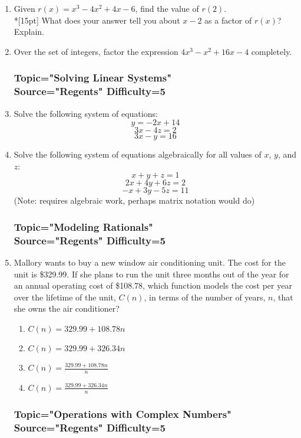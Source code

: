 \documentclass[12pt, oneside]{article}
\begin{document}
\begin{enumerate}
\item Given $r(x)=x^3-4x^2+4x-6$, find the value of $r(2)$.\\*[15pt]
What does your answer tell you about $x-2$ as a factor of $r(x)$? Explain. %

\item Over the set of integers, factor the expression $4x^3-x^2  +16x-4$ completely.
 
\subsubsection*{Topic="Solving Linear Systems"\\
Source="Regents" 
Difficulty=5}

\item Solve the following system of equations:
\[y=-2x+14\]
\[3x - 4z = 2\]
\[3x - y  = 16\]

\item Solve the following system of equations algebraically for all values of $x$, $y$, and $z$:
\[x +y+ z=1\]
\[2x+4y+6z=2\]
\[-x+3y-5z=11\]
(Note: requires algebraic work, perhaps matrix notation would do)

\subsubsection*{Topic="Modeling Rationals"\\
Source="Regents" 
Difficulty=5}

\item Mallory wants to buy a new window air conditioning unit. The cost for the unit is \$329.99. If she plans to run the unit three months out of the year for an annual operating cost of \$108.78, which function models the cost per year over the lifetime of the unit, $C(n)$, in terms of the number of years, $n$, that she owns the air conditioner?
\begin{enumerate}
    \item $C(n)=329.99+108.78n$
    \item $C(n)=329.99+326.34n$
    \item $\displaystyle C(n)=\frac{329.99+108.78n}{n}$
    \item $\displaystyle C(n)=\frac{329.99+326.34n}{n}$
\end{enumerate} %

\subsubsection*{Topic="Operations with Complex Numbers"\\
Source="Regents" 
Difficulty=5}


\end{enumerate}
\end{document}
